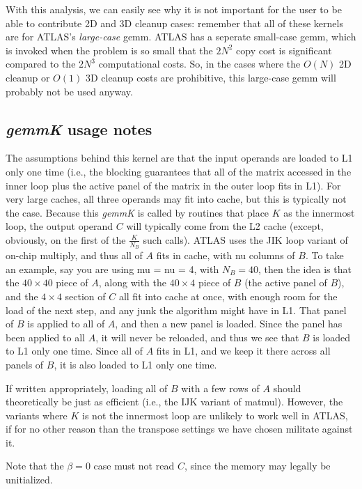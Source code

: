 \documentclass[11pt]{article}
\begin{document}
With this analysis, we can easily see why it is not important for the
user to be able to contribute 2D and 3D cleanup cases: remember that
all of these kernels are for ATLAS's {\em large-case} gemm.  ATLAS has a 
seperate small-case gemm, which is invoked when the problem is so small
that the $2 N^2$ copy cost is significant compared to the $2 N^3$ computational
costs.  So, in the cases where the $O(N)$ 2D cleanup or $O(1)$ 3D cleanup
costs are prohibitive, this large-case gemm will probably not be used anyway.

\subsection{{\it gemmK} usage notes}
The assumptions behind this kernel are that the input operands are
loaded to L1 only one time (i.e., the blocking guarantees that all
of the matrix accessed in the inner loop plus the active panel of
the matrix in the outer loop fits in L1).  For very large caches, all
three operands may fit into cache, but this is typically not the
case.  Because this {\it gemmK} is called by routines that place $K$
as the innermost loop, the output operand $C$ will typically come
from the L2 cache (except, obviously, on the first of the 
$\frac{K}{N_B}$ such calls).  ATLAS uses the JIK loop variant of
on-chip multiply, and thus all of $A$ fits in cache, with nu columns
of $B$.  To take an example, say you are using mu = nu = 4, with
$N_B = 40$, then the idea is that the $40 \times 40$ piece of $A$,
along with the $40 \times 4$ piece of $B$ (the active panel of $B$),
and the $4 \times 4$ section of $C$ all fit into cache at once, with
enough room for the load of the next step, and any junk the algorithm
might have in L1.  That panel of $B$ is applied to all of $A$, and then
a new panel is loaded.  Since the panel has been applied to all $A$, it
will never be reloaded, and thus we see that $B$ is loaded to L1 only
one time.  Since all of $A$ fits in L1, and we keep it there across all
panels of $B$, it is also loaded to L1 only one time. 

If written appropriately, loading all of $B$ with a few rows
of $A$ should theoretically be just as efficient (i.e., the IJK variant
of matmul).  However, the variants where $K$ is not the innermost loop
are unlikely to work well in ATLAS, if for no other reason than the 
transpose settings we have chosen militate against it.

Note that the $\beta = 0$ case must not read $C$, since the memory may
legally be unitialized.
\end{document}
